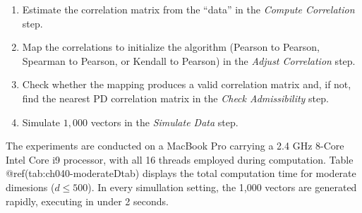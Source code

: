 \documentclass{article}
\begin{document}
\begin{enumerate}
\def\labelenumi{\arabic{enumi}.}
\tightlist
\item
  Estimate the correlation matrix from the ``data'' in the \emph{Compute
  Correlation} step.
\item
  Map the correlations to initialize the algorithm (Pearson to Pearson,
  Spearman to Pearson, or Kendall to Pearson) in the \emph{Adjust
  Correlation} step.
\item
  Check whether the mapping produces a valid correlation matrix and, if
  not, find the nearest PD correlation matrix in the \emph{Check
  Admissibility} step.
\item
  Simulate \(1,000\) vectors in the \emph{Simulate Data} step.
\end{enumerate}

The experiments are conducted on a MacBook Pro carrying a 2.4 GHz 8-Core
Intel Core i9 processor, with all 16 threads employed during
computation. Table @ref(tab:ch040-moderateDtab) displays the total
computation time for moderate dimesions (\(d \leq 500\)). In every
simullation setting, the 1,000 vectors are generated rapidly, executing
in under 2 seconds.
\end{document}
